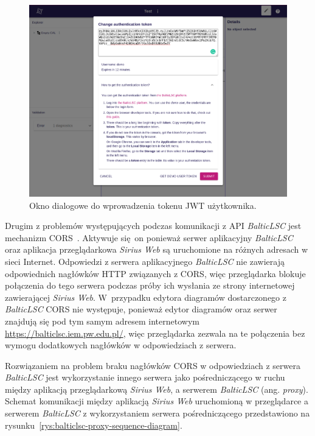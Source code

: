 \begin{figure}[!hb]
  \centering

  \includegraphics[width=0.95\linewidth]{./images/balticlsc-change-jwt-modal-with-instructions.png}
  \caption{Okno dialogowe do wprowadzenia tokenu \gls{JWT}
    użytkownika.}\label{rys:balticlsc-change-jwt-modal}
\end{figure}

Drugim z problemów występujących podczas komunikacji z \gls{API}
\emph{BalticLSC} jest mechanizm \gls{CORS}~\cite{cors-documentation}. Aktywuje
się on ponieważ serwer
aplikacyjny \emph{BalticLSC} oraz aplikacja przeglądarkowa \emph{Sirius Web} są
uruchomione na różnych adresach w sieci Internet. Odpowiedzi z serwera
aplikacyjnego \emph{BalticLSC} nie zawierają odpowiednich nagłówków \gls{HTTP}
związanych z \gls{CORS},
więc przeglądarka blokuje połączenia do tego serwera podczas próby ich wysłania
ze
strony internetowej zawierającej \emph{Sirius Web}. W~przypadku edytora
diagramów dostarczonego z \emph{BalticLSC} \gls{CORS} nie występuje, ponieważ
edytor diagramów oraz serwer znajdują się pod tym samym adresem internetowym
\url{https://balticlsc.iem.pw.edu.pl/}, więc przeglądarka zezwala na te
połączenia bez wymogu dodatkowych nagłówków w odpowiedziach z serwera.

Rozwiązaniem na problem braku nagłówków \gls{CORS} w odpowiedziach z serwera
\emph{BalticLSC} jest wykorzystanie innego serwera jako pośredniczącego w ruchu
między aplikacją przeglądarkową \emph{Sirius Web}, a serwerem \emph{BalticLSC}
(ang. \emph{proxy}). Schemat komunikacji między
aplikacją \emph{Sirius Web} uruchomioną w przeglądarce a serwerem
\emph{BalticLSC} z wykorzystaniem serwera pośredniczącego przedstawiono na
rysunku~\ref{rys:balticlsc-proxy-sequence-diagram}.

